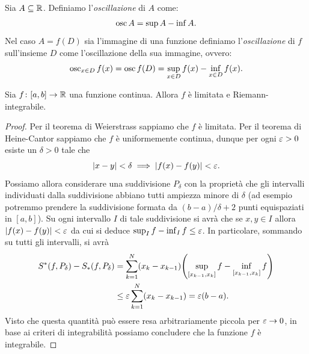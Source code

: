 \begin{definition}\label{def:osc}
Sia $A\subseteq {\mathbb R}$. Definiamo 
l'\emph{oscillazione} di $A$ come:
\[
  \operatorname{osc} A = \sup A - \inf A.
\]
Nel caso $A=f(D)$ sia l'immagine di una funzione 
definiamo l'\emph{oscillazione} di $f$ sull'insieme 
$D$ come l'oscillazione della sua immagine, ovvero:
\[
   \operatorname{osc}_{x\in D} f(x) 
   = \operatorname{osc} f(D) 
   = \sup_{x\in D} f(x) - \inf_{x\in D} f(x).  
\]
\end{definition}

\begin{theorem}
  \mymark{***}%
  \label{th:integrabilita_continue}%
  Sia $f\colon [a,b]\to {\mathbb R}$ una funzione continua.
  Allora $f$ è limitata e Riemann-integrabile.
  \end{theorem}
  \begin{proof}
  \mymark{***}
  Per il teorema di Weierstrass sappiamo che $f$ è limitata.
  Per il teorema di Heine-Cantor sappiamo che $f$ è uniformemente continua,
  dunque per ogni $\varepsilon>0$ esiste un $\delta>0$ tale che
  \[
   {\left|x-y\right|} < \delta \implies {\left|f(x)-f(y)\right|} < \varepsilon.
  \]
  Possiamo allora considerare una suddivisione $P_\delta$ con la proprietà che
  gli intervalli individuati dalla suddivisione abbiano tutti ampiezza minore di
  $\delta$ (ad esempio potremmo prendere la suddivisione formata da
  $(b-a)/\delta+2$ punti equispaziati in $[a,b]$). Su ogni intervallo $I$ di tale
  suddivisione si avrà che se $x,y\in I$ allora ${\left|f(x)-f(y)\right|} < \varepsilon$ da cui
  si deduce $\sup_I f - \inf_I f \le \varepsilon$.
  In particolare, sommando su tutti gli intervalli, si avrà
  \begin{align*}
    S^*(f,P_\delta) - S_*(f,P_\delta)
    &= \sum_{k=1}^N (x_k-x_{k-1}){\left( \sup_{[x_{k-1},x_k]} f - \inf_{[x_{k-1},x_k]} f \right)} \\
    &\le \varepsilon \sum_{k=1}^N (x_k - x_{k-1})
     = \varepsilon (b-a).
  \end{align*}
  Visto che questa quantità può essere resa arbitrariamente piccola per
  $\varepsilon \to 0$, in base ai criteri di integrabilità possiamo concludere che la
  funzione $f$ è integrabile.
  \end{proof}
  
